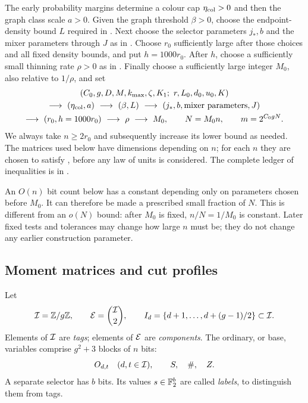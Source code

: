 The early probability margins determine a colour cap \(\eta_{\rm col}>0\)
and then the graph class scale \(a>0\).  Given the graph threshold
\(\beta>0\), choose the endpoint-density bound \(L\) required in
.  Next choose the selector parameters
\(j_*,b\) and the mixer parameters through \(J\) as in
.  Choose \(r_0\) sufficiently large after those choices
and all fixed density bounds, and put \(h=1000r_0\).  After \(h\), choose
a sufficiently small thinning rate \(\rho>0\) as in
.  Finally choose a sufficiently large integer
\(M_0\), also relative to \(1/\rho\), and set
\begin{equation}\label{eq:parameter-order}
 \begin{gathered}
 (C_0,g,D,M,k_{\max},\zeta,K_1;\ r,L_0,d_0,u_0,K)\\
 \longrightarrow\ (\eta_{\rm col},a)
 \ \longrightarrow\ (\beta,L)
 \ \longrightarrow\ (j_*,b,\text{mixer parameters},J)\\
 \longrightarrow\ (r_0,h=1000r_0)
 \ \longrightarrow\ \rho
 \ \longrightarrow\ M_0,\qquad
 N=M_0n,\qquad m=2^{C_0gN}.
 \end{gathered}
\end{equation}
We always take \(n\ge 2r_0\) and subsequently increase its lower bound as needed.
The matrices used below have dimensions depending on \(n\); for each \(n\) they are chosen to satisfy , before any law of units is considered.
The complete ledger of inequalities is in .

An \(O(n)\) bit count below has a constant depending only on parameters chosen before \(M_0\).
It can therefore be made a prescribed small fraction of \(N\).
This is different from an \(o(N)\) bound: after \(M_0\) is fixed, \(n/N=1/M_0\) is constant.
Later fixed tests and tolerances may change how large \(n\) must be; they do not change any earlier construction parameter.

\subsection{Moment matrices and cut profiles}

Let
\[
 \mathcal I=\mathbb Z/g\mathbb Z,\qquad
 \mathcal E=\binom{\mathcal I}{2},\qquad
 I_d=\{d+1,\ldots,d+(g-1)/2\}\subset\mathcal I .
\]
Elements of \(\mathcal I\) are \emph{tags}; elements of \(\mathcal E\) are \emph{components}.
The ordinary, or base, variables comprise \(g^2+3\) blocks of \(n\) bits:
\[
 O_{d,t}\quad(d,t\in\mathcal I),\qquad S,\quad \#,\quad Z.
\]
A separate selector has \(b\) bits.  Its values \(s\in\mathbb F_2^b\) are called \emph{labels}, to distinguish them from tags.

